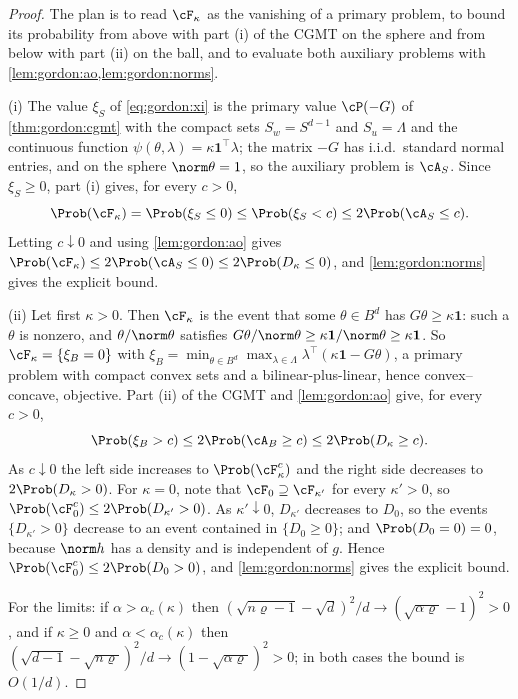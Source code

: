 \begin{refsection}
\begin{proof}
The plan is to read $\cF_\kappa$ as the vanishing of a primary problem, to bound its probability from above with part (i) of the CGMT on the sphere and from below with part (ii) on the ball, and to evaluate both auxiliary problems with \cref{lem:gordon:ao,lem:gordon:norms}.

(i) The value $\xi_S$ of \eqref{eq:gordon:xi} is the primary value $\cP(-G)$ of \cref{thm:gordon:cgmt} with the compact sets $S_w=S^{d-1}$ and $S_u=\Lambda$ and the continuous function $\psi(\theta,\lambda)=\kappa\mathbf 1^\top\lambda$; the matrix $-G$ has i.i.d.\ standard normal entries, and on the sphere $\norm\theta=1$, so the auxiliary problem is $\cA_S$. Since $\xi_S\ge0$, part (i) gives, for every $c>0$,
\[
\Prob(\cF_\kappa)=\Prob(\xi_S\le0)\le\Prob(\xi_S<c)\le2\Prob(\cA_S\le c).
\]
Letting $c\downarrow0$ and using \cref{lem:gordon:ao} gives $\Prob(\cF_\kappa)\le2\Prob(\cA_S\le0)\le2\Prob(D_\kappa\le0)$, and \cref{lem:gordon:norms} gives the explicit bound.

(ii) Let first $\kappa>0$. Then $\cF_\kappa$ is the event that some $\theta\in B^d$ has $G\theta\ge\kappa\mathbf 1$: such a $\theta$ is nonzero, and $\theta/\norm\theta$ satisfies $G\theta/\norm\theta\ge\kappa\mathbf 1/\norm\theta\ge\kappa\mathbf 1$. So $\cF_\kappa=\{\xi_B=0\}$ with $\xi_B=\min_{\theta\in B^d}\max_{\lambda\in\Lambda}\lambda^\top(\kappa\mathbf 1-G\theta)$, a primary problem with compact convex sets and a bilinear-plus-linear, hence convex--concave, objective. Part (ii) of the CGMT and \cref{lem:gordon:ao} give, for every $c>0$,
\[
\Prob(\xi_B>c)\le2\Prob(\cA_B\ge c)\le2\Prob(D_\kappa\ge c).
\]
As $c\downarrow0$ the left side increases to $\Prob(\cF_\kappa^c)$ and the right side decreases to $2\Prob(D_\kappa>0)$. For $\kappa=0$, note that $\cF_0\supseteq\cF_{\kappa'}$ for every $\kappa'>0$, so $\Prob(\cF_0^c)\le2\Prob(D_{\kappa'}>0)$. As $\kappa'\downarrow0$, $D_{\kappa'}$ decreases to $D_0$, so the events $\{D_{\kappa'}>0\}$ decrease to an event contained in $\{D_0\ge0\}$; and $\Prob(D_0=0)=0$, because $\norm h$ has a density and is independent of $g$. Hence $\Prob(\cF_0^c)\le2\Prob(D_0>0)$, and \cref{lem:gordon:norms} gives the explicit bound.

For the limits: if $\alpha>\alpha_c(\kappa)$ then $(\sqrt{n\varrho-1}-\sqrt d)^2/d\to(\sqrt{\alpha\varrho}-1)^2>0$, and if $\kappa\ge0$ and $\alpha<\alpha_c(\kappa)$ then $(\sqrt{d-1}-\sqrt{n\varrho})^2/d\to(1-\sqrt{\alpha\varrho})^2>0$; in both cases the bound is $O(1/d)$.
\end{proof}


\end{refsection}
